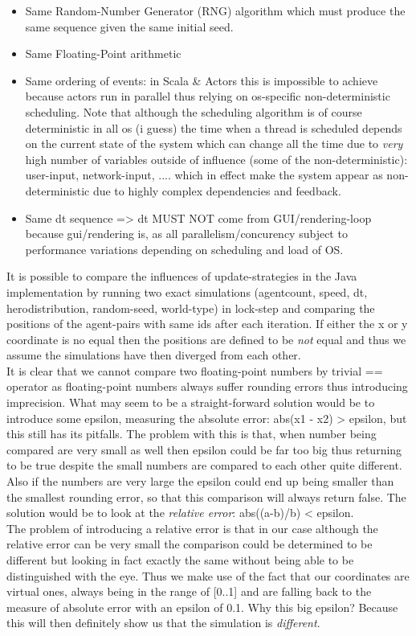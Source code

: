 \begin{itemize}
\item Same Random-Number Generator (RNG) algorithm which must produce the same sequence given the same initial seed.
\item Same Floating-Point arithmetic
\item Same ordering of events: in Scala \& Actors this is impossible to achieve because actors run in parallel thus relying on os-specific non-deterministic scheduling. Note that although the scheduling algorithm is of course deterministic in all os (i guess) the time when a thread is scheduled depends on the current state of the system which can change all the time due to \textit{very} high number of variables outside of influence (some of the non-deterministic): user-input, network-input, .... which in effect make the system appear as non-deterministic due to highly complex dependencies and feedback.
\item Same dt sequence => dt MUST NOT come from GUI/rendering-loop because gui/rendering is, as all parallelism/concurency subject to performance variations depending on scheduling and load of OS.
\end{itemize}

It is possible to compare the influences of update-strategies in the Java implementation by running two exact simulations (agentcount, speed, dt, herodistribution, random-seed, world-type) in lock-step and comparing the positions of the agent-pairs with same ids after each iteration. If either the x or y coordinate is no equal then the positions are defined to be \textit{not} equal and thus we assume the simulations have then diverged from each other. \\
It is clear that we cannot compare two floating-point numbers by trivial == operator as floating-point numbers always suffer rounding errors thus introducing imprecision. What may seem to be a straight-forward solution would be to introduce some epsilon, measuring the absolute error: abs(x1 - x2) > epsilon, but this still has its pitfalls. The problem with this is that, when number being compared are very small as well then epsilon could be far too big thus returning to be true despite the small numbers are compared to each other quite different. Also if the numbers are very large the epsilon could end up being smaller than the smallest rounding error, so that this comparison will always return false. The solution would be to look at the \textit{relative error}: abs((a-b)/b) < epsilon. \\
The problem of introducing a relative error is that in our case although the relative error can be very small the comparison could be determined to be different but looking in fact exactly the same without being able to be distinguished with the eye. Thus we make use of the fact that our coordinates are virtual ones, always being in the range of [0..1] and are falling back to the measure of absolute error with an epsilon of 0.1. Why this big epsilon? Because this will then definitely show us that the simulation is \textit{different}. \\

